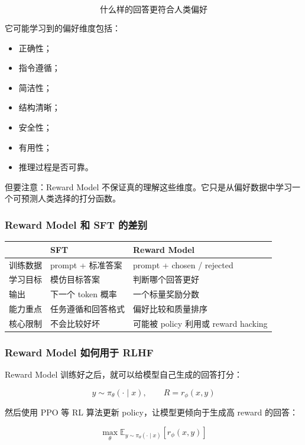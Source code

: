 \[
\text{什么样的回答更符合人类偏好}
\]

它可能学习到的偏好维度包括：

\begin{itemize}[leftmargin=1.5em]
  \item 正确性；
  \item 指令遵循；
  \item 简洁性；
  \item 结构清晰；
  \item 安全性；
  \item 有用性；
  \item 推理过程是否可靠。
\end{itemize}

但要注意：Reward Model 不保证真的理解这些维度。它只是从偏好数据中学习一个可预测人类选择的打分函数。

\subsubsection{Reward Model 和 SFT 的差别}

\begin{center}
{\small
\begin{tabular}{p{3cm}p{4.8cm}p{4.8cm}}
\hline
 & \textbf{SFT} & \textbf{Reward Model} \\
\hline
训练数据 & prompt + 标准答案 & prompt + chosen / rejected \\
学习目标 & 模仿目标答案 & 判断哪个回答更好 \\
输出 & 下一个 token 概率 & 一个标量奖励分数 \\
能力重点 & 任务遵循和回答格式 & 偏好比较和质量排序 \\
核心限制 & 不会比较好坏 & 可能被 policy 利用或 reward hacking \\
\hline
\end{tabular}
}
\end{center}

\subsubsection{Reward Model 如何用于 RLHF}

Reward Model 训练好之后，就可以给模型自己生成的回答打分：

\[
y \sim \pi_\theta(\cdot \mid x), \qquad R = r_\phi(x, y)
\]

然后使用 PPO 等 RL 算法更新 policy，让模型更倾向于生成高 reward 的回答：

\[
\max_\theta \mathbb{E}_{y \sim \pi_\theta(\cdot \mid x)}[r_\phi(x, y)]
\]

